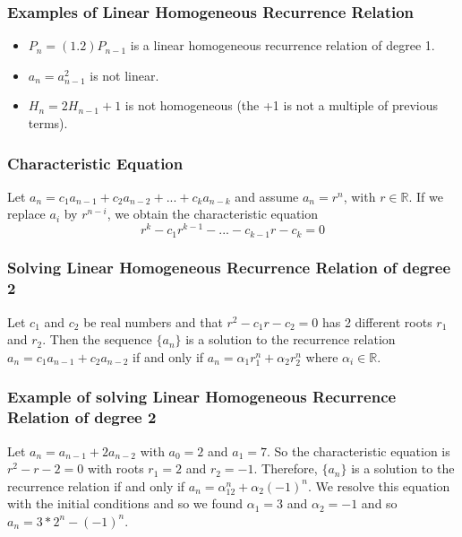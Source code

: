 \documentclass{article}
\begin{document}
\subsubsection{Examples of Linear Homogeneous Recurrence Relation}
\begin{itemize}
\item $ P_n = (1.2)P_{n-1} $ is a linear homogeneous recurrence relation of degree 1.
\item $ a_n = a_{n-1}^2 $ is not linear.
\item $ H_n = 2H_{n-1} + 1 $ is not homogeneous (the +1 is not a multiple of previous terms).
\end{itemize}

\subsubsection{Characteristic Equation} Let $ a_n = c_1a_{n-1} + c_2a_{n-2} + ... + c_ka_{n-k} $ and assume $ a_n = r^n $, with $ r \in \mathbb{R} $. If we replace $ a_i $ by $ r^{n-i} $, we obtain the characteristic equation
\begin{equation}
r^k - c_1r^{k-1} - ... - c_{k-1}r - c_k = 0
\end{equation}

\subsubsection{Solving Linear Homogeneous Recurrence Relation of degree 2} Let $ c_1 $ and $ c_2 $ be real numbers and that $ r^2 - c_1r - c_2 = 0 $ has 2 different roots $ r_1 $ and $ r_2 $. Then the sequence $ \{a_n\} $ is a solution to the recurrence relation $ a_n = c_1a_{n-1} + c_2a_{n-2} $ if and only if $ a_n = \alpha_1r_{1}^n + \alpha_2r_{2}^n $ where $ \alpha_i \in \mathbb{R} $.

\subsubsection{Example of solving Linear Homogeneous Recurrence Relation of degree 2} Let $ a_n = a_{n-1} + 2a_{n-2} $ with $ a_0 = 2 $ and $ a_1 = 7 $. So the characteristic equation is $ r^2 - r - 2 = 0 $ with roots $ r_1 = 2 $ and $ r_2 = -1 $. Therefore, $ \{a_n\} $ is a solution to the recurrence relation if and only if $ a_n = \alpha_12^n + \alpha_2(-1)^n $. We resolve this equation with the initial conditions and so we found $ \alpha_1 = 3 $ and $ \alpha_2 = -1 $ and so $ a_n = 3*2^n -(-1)^n $.
\end{document}
